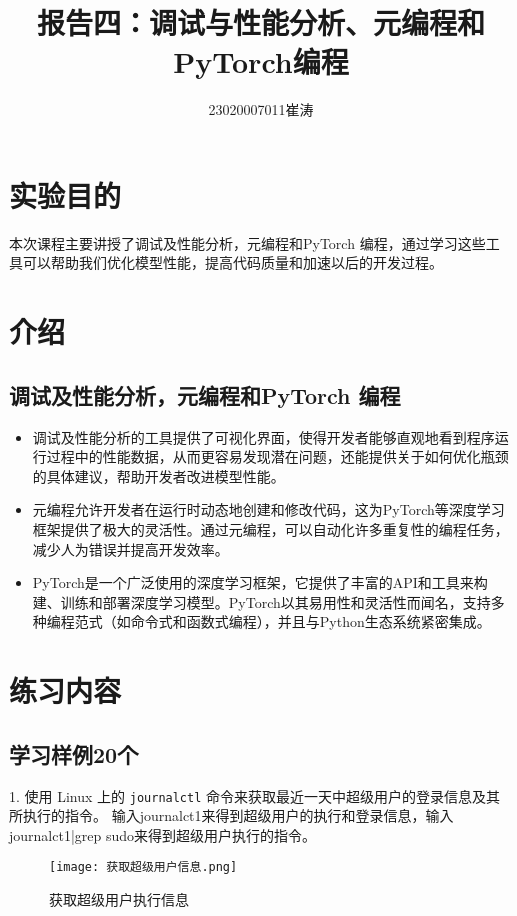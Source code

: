 \documentclass{article}
\title{报告四：调试与性能分析、元编程和PyTorch编程}
\author{23020007011崔涛}
\begin{document}
\maketitle

\section{实验目的}
本次课程主要讲授了调试及性能分析，元编程和PyTorch 编程，通过学习这些工具可以帮助我们优化模型性能，提高代码质量和加速以后的开发过程。

\section{介绍}
\subsection{调试及性能分析，元编程和PyTorch 编程}
\begin{itemize}
\item 调试及性能分析的工具提供了可视化界面，使得开发者能够直观地看到程序运行过程中的性能数据，从而更容易发现潜在问题，还能提供关于如何优化瓶颈的具体建议，帮助开发者改进模型性能。\newline
\item 元编程允许开发者在运行时动态地创建和修改代码，这为PyTorch等深度学习框架提供了极大的灵活性。通过元编程，可以自动化许多重复性的编程任务，减少人为错误并提高开发效率。\newline
\item PyTorch是一个广泛使用的深度学习框架，它提供了丰富的API和工具来构建、训练和部署深度学习模型。PyTorch以其易用性和灵活性而闻名，支持多种编程范式（如命令式和函数式编程），并且与Python生态系统紧密集成。
\end{itemize}
\section{练习内容}
\subsection{学习样例20个}
1. 使用 Linux 上的 \verb|journalctl| 命令来获取最近一天中超级用户的登录信息及其所执行的指令。\newline 
输入journalct1来得到超级用户的执行和登录信息，输入journalct1|grep sudo来得到超级用户执行的指令。\newpage
\begin{figure}[!h]
    \centering
    \texttt{[image: 获取超级用户信息.png]}
    \caption{获取超级用户执行信息}
    \label{fig:enter-label}
\end{figure}
\end{document}
